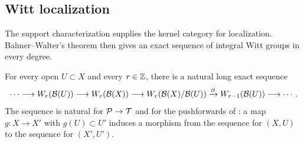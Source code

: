 \subsection{Witt localization}

The support characterization supplies the kernel category for
localization.  Balmer--Walter's theorem then gives an exact sequence
of integral Witt groups in every degree.

\begin{theorem}
\label{thm:witt-localization}
For every open $U\subset X$ and every $r\in\mathbb Z$, there is a natural
long exact sequence
\begin{equation}
\label{loc:eq-witt-localization}
 \cdots\longrightarrow W_r(\mathcal B(U))
 \longrightarrow W_r(\mathcal B(X))
 \longrightarrow W_r(\mathcal B(X)/\mathcal B(U))
 \xrightarrow{\partial}W_{r-1}(\mathcal B(U))
 \longrightarrow\cdots.
\end{equation}
The sequence is natural for $\mathcal P\to\mathcal T$ and for the pushforwards
of : a map $g:X\to X'$ with
$g(U)\subset U'$ induces a morphism from the sequence for $(X,U)$
to the sequence for $(X',U')$.
\end{theorem}

